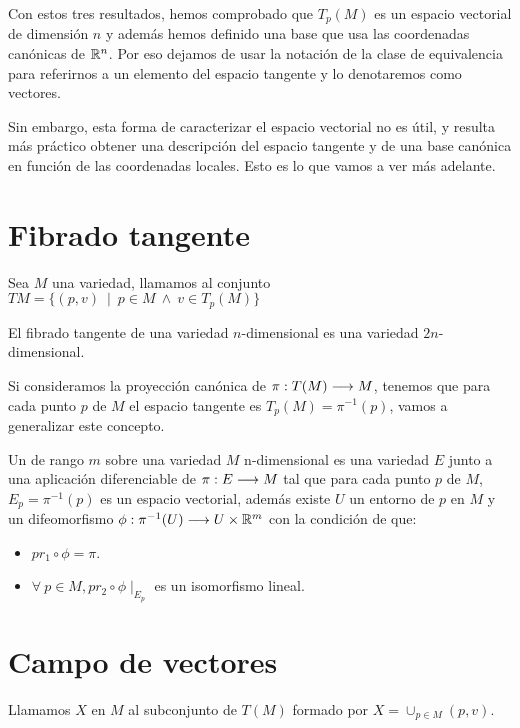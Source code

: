 Con estos tres resultados, hemos comprobado que $T_p(M)$ es un espacio vectorial de dimensión $n$
y además hemos definido una base que usa las coordenadas canónicas de $\mathbb{R}^n$.
Por eso dejamos de usar la notación de la clase de equivalencia para referirnos a un elemento del
espacio tangente y lo denotaremos como vectores.

Sin embargo, esta forma de caracterizar el espacio vectorial no es útil, y resulta más práctico
obtener una descripción del espacio tangente y de una base canónica en función de las coordenadas
locales.
Esto es lo que vamos a ver más adelante.


\section{Fibrado tangente}\label{sec:fibrado-tangente}
\begin{definition}
  Sea $M$ una variedad, llamamos  al
  conjunto $TM=\{(p,v)\ \mid\ p\in M\ \land\ v\in T_p(M)\}$
\end{definition}

\begin{proposition}
  El fibrado tangente de una variedad $n$-dimensional es una variedad $2n$-dimensional.
\end{proposition}

Si consideramos la proyección canónica de $\pi:T(M)\longrightarrow M$, tenemos que para cada punto $p$ de
$M$ el espacio tangente es $T_p(M)=\pi^{-1}(p)$, vamos a generalizar este concepto.

\begin{definition}
  Un  de rango $m$ sobre una variedad $M$
  n-dimensional es una variedad $E$ junto a una aplicación diferenciable de $\pi:E\longrightarrow M$ tal
  que para cada punto $p$ de $M$, $E_p=\pi^{-1}(p)$ es un espacio vectorial, además existe $U$ un
  entorno de $p$ en $M$ y un difeomorfismo $\phi:\pi^{-1}(U)\longrightarrow U\times\mathbb{R}^m$ con la condición
  de que:
  \begin{itemize}
    \item $pr_1\circ\phi=\pi$.
    \item $\forall\ p\in M, pr_2\circ\phi\mid_E_p$ es un isomorfismo lineal.
  \end{itemize}
\end{definition}


\section{Campo de vectores}\label{sec:campo-de-vectores}
\begin{definition}
  Llamamos \label{def:campo-vectores} $X$ en $M$ al subconjunto de $T(M)$ formado por
  $X=\cup_{p\in M}(p,
  v)$.
\end{definition}

